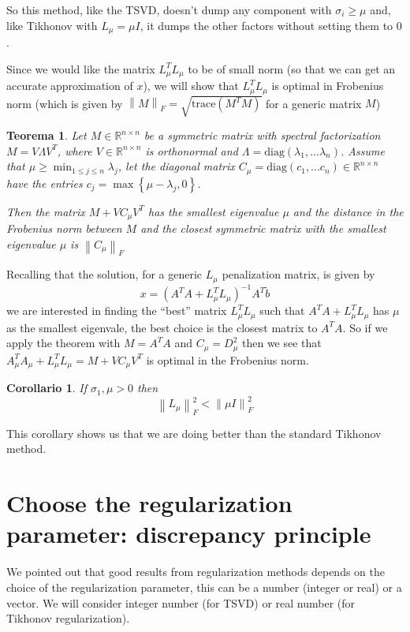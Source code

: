 \documentclass[a4paper,10pt]{article}
\newcounter{counter1}
\theoremstyle{plain}
\newtheorem{myteo}[counter1]{Teorema}
\newtheorem{mycor}[counter1]{Corollario}
\theoremstyle{definition}
\theoremstyle{remark}
\newcommand{\set}[1]{\left\{#1\right\}}
\newcommand{\pa}[1]{\left(#1\right)}
\newcommand{\norm}[1]{\left\|#1\right\|}
\begin{document}
So this method, like the TSVD, doesn't dump any component with $\sigma
_i \ge \mu$ and, like Tikhonov with $L_\mu = \mu I$, it dumps the
other factors without setting them to $0$.

Since we would like the matrix $L_\mu ^T L_\mu$ to be of small norm
(so that we can get an accurate approximation of $x$), we will show
that $L_\mu ^T L_\mu$ is optimal in Frobenius norm (which is given by
$\norm{M}_F = \sqrt{ \mathrm{trace} \pa{ M^T M } }$ for a generic
matrix $M$)

\begin{myteo}
  Let $M \in \mathbb{R}^{n\times n}$ be a symmetric matrix with
  spectral factorization $M = V \Lambda V^T$, where $V \in
  \mathbb{R}^{n \times n}$ is orthonormal and $\Lambda = \mathrm{diag} \pa{
    \lambda _1, ... \lambda _n}$. Assume that $\mu \ge \min _{1\le
    j\le n} \lambda _j$, let the diagonal matrix $C_\mu = \mathrm{diag}
  \pa{ c_1 , ... c_n}\in \mathbb{R}^{n\times n}$ have the entries $c_j
  = \max \set{\mu - \lambda _j, 0}$.
  
  Then the matrix $M + V C_\mu V^T$ has the smallest eigenvalue $\mu$
  and the distance in the Frobenius norm between $M$ and the closest
  symmetric matrix with the smallest eigenvalue $\mu$ is $\norm{ C_\mu
  }_F$
\end{myteo}

Recalling that the solution, for a generic $L_\mu$ penalization
matrix, is given by
\[ x = \pa{ A^T A + L_\mu^T L_\mu }^{-1} A^T \tilde b \] we are
interested in finding the ``best'' matrix $L_\mu^T L_\mu$ such that
$A^T A + L_\mu^T L_\mu$ has $\mu$ as the smallest eigenvale, the best
choice is the closest matrix to $A^T A$. So if we apply the theorem
with $M = A^T A$ and $C_\mu = D_\mu ^2$ then we see that $A_\mu ^T
A_\mu + L_\mu ^T L_\mu = M + V C_\mu V^T$ is optimal in the Frobenius
norm.

\begin{mycor}
  If $\sigma _1,\mu > 0$ then
  \[ \norm{ L_\mu }^2 _F < \norm{ \mu I} ^2_F \]
\end{mycor}

This corollary shows us that we are doing better than the standard
Tikhonov method.

\section{Choose the regularization parameter: discrepancy principle}
\label{sec:discrepancy}

We pointed out that good results from regularization methods depends
on the choice of the regularization parameter, this can be a number
(integer or real) or a vector. We will consider integer number (for
TSVD) or real number (for Tikhonov regularization).
\end{document}
